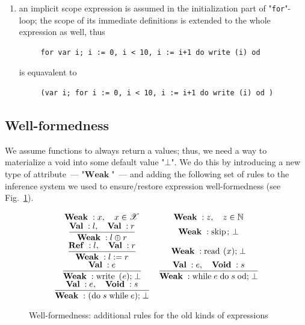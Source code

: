 \documentclass{article}
\newcommand{\trule}[2]{\dfrac{#1}{#2}}
\newcommand{\withenv}[2]{{#1}\vdash{#2}}
\newcommand{\llang}[1]{\mbox{\lstinline[mathescape]|#1|}}
\newcommand{\primi}[2]{\mathbf{#1}\;{#2}}
\theoremstyle{definition}
\begin{document}
\begin{enumerate}
  is equivalent to

  \begin{lstlisting}
    (var i;
     do read (i) while x > 0 od)
  \end{lstlisting}

\item an implicit scope expression is assumed in the initialization part of "\lstinline|for|"-loop; the scope of its immediate definitions
  is extended to the whole expression as well, thus

  \begin{lstlisting}
     for var i; i := 0, i < 10, i := i+1 do write (i) od
  \end{lstlisting}

  is equavalent to

  \begin{lstlisting}
     (var i; for i := 0, i < 10, i := i+1 do write (i) od )
  \end{lstlisting}

\end{enumerate}

\subsection{Well-formedness}

\ifdefined\Ref
  \renewcommand{\Ref}{\primi{Ref}{}}
\else
  \newcommand{\Ref}{\primi{Ref}{}}
\fi
\newcommand{\Val}{\primi{Val}{}}
\newcommand{\Void}{\primi{Void}{}}
\newcommand{\Weak}{\primi{Weak}{}}

We assume functions to always return a values; thus, we need a way to materialize a void into some default value "$\bot$".  We
do this by introducing a new type of attribute~--- "$\Weak$"~--- and adding the following set of rules to
the inference system we used to ensure/restore expression well-formedness (see Fig.~\ref{well_formed_old}).

\renewcommand{\withenv}[2]{{#1}:{#2}}

\begin{figure}[h]
  \renewcommand{\arraystretch}{2}
\[
  \begin{array}{cc}
    \withenv{\Weak}{x},\quad x \in \mathscr X       & \withenv{\Weak}{z},\quad z \in \mathbb N \\
  \trule{\withenv{\Val}{l},\quad\withenv{\Val}{r}}
        {\withenv{\Weak}{l\oplus r}}               & \withenv{\Weak}{\llang{skip; $\;\bot$}} \\[2mm]
  \trule{\withenv{\Ref}{l},\quad\withenv{\Val}{r}}
        {\withenv{\Weak}{\llang{$l\;$ := $\; r$}}} & \withenv{\Weak}{\llang{read ($x$); $\;\bot$}} \\[2mm]
  \trule{\withenv{\Val}{e}}{\withenv{\Weak}{\llang{write ($e$); $\;\bot$}}} & \trule{\withenv{\Val}{e},\quad\withenv{\Void}{s}}{\withenv{\Weak}{\llang{while $\;e\;$ do $\;s\;$ od; $\;\bot$}}} \\[2mm]
  \trule{\withenv{\Val}{e},\quad\withenv{\Void}{s}}{\withenv{\Weak}{\llang{(do $\;s\;$ while $\;e$); $\;\bot$ }}} &
  \end{array}
  \]
  \caption{Well-formedness: additional rules for the old kinds of expressions}
  \label{well_formed_old}
\end{figure}
\end{document}
